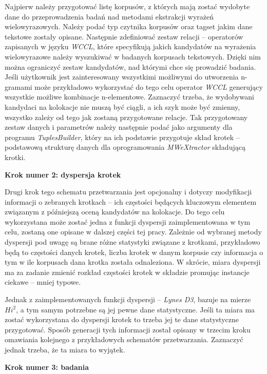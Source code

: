 \documentclass[11pt,a4paper]{llncs}
\begin{document}
Najpierw należy przygotować listę korpusów, z których mają zostać wydobyte dane do przeprowadzenia badań nad metodami ekstrakcji wyrażeń wielowyrazowych.
Należy podać typ czytnika korpusów oraz tagset jakim dane tekstowe zostały opisane.
Następnie zdefiniować zestaw relacji -- operatorów zapisanych w języku \emph{WCCL}, które specyfikują jakich kandydatów na wyrażenia wielowyrazowe należy wyszukiwać w badanych korpusach tekstowych.
Dzięki nim można ograniczyć zestaw kandydatów, nad którymi chce się prowadzić badania.
Jeśli użytkownik jest zainteresowany wszystkimi możliwymi do utworzenia n-gramami może przykładowo wykorzystać do tego celu operator \emph{WCCL} generujący wszystkie możliwe kombinacje n-elementowe.
Zaznaczyć trzeba, że wydobywani kandydaci na kolokacje nie muszą być ciągli, a ich szyk może być zmienny, wszystko zależy od tego jak zostaną przygotowane relacje.
Tak przygotowany zestaw danych i parametrów należy następnie podać jako argumenty dla programu \emph{TuplesBuilder}, który na ich podstawie przygotuje skład krotek -- podstawową strukturę danych dla oprogramowania \emph{MWeXtractor} składującą krotki.


\noindent\textbf{Krok numer 2: dyspersja krotek}


Drugi krok tego schematu przetwarzania jest opcjonalny i dotyczy modyfikacji informacji o zebranych krotkach -- ich częstości będących kluczowym elementem związanym z późniejszą oceną kandydatów na kolokacje.
Do tego celu wykorzystana może zostać jedna z funkcji dyspersji zaimplementowana w tym celu, zostaną one opisane w dalszej części tej pracy.
Zależnie od wybranej metody dyspersji pod uwagę są brane różne statystyki związane z krotkami, przykładowo będą to częstości danych krotek, liczba krotek w danym korpusie czy informacja o tym w ile korpusach dana krotka została odnaleziona.
W skrócie, miara dyspersji ma za zadanie zmienić rozkład częstości krotek w składzie promując instancje ciekawe -- mniej typowe.
\par
Jednak z zaimplementowanych funkcji dyspersji -- \emph{Lynes D3}, bazuje na mierze $ Hi^{2} $, a tym samym potrzebne są jej pewne dane statystyczne.
Jeśli ta miara ma zostać wykorzystana do dyspersji krotek to trzeba jej te dane statystyczne przygotować.
Sposób generacji tych informacji został opisany w trzecim kroku omawiania kolejnego z przykładowych schematów przetwarzania.
Zaznaczyć jednak trzeba, że ta miara to wyjątek.


\noindent\textbf{Krok numer 3: badania}
\end{document}
